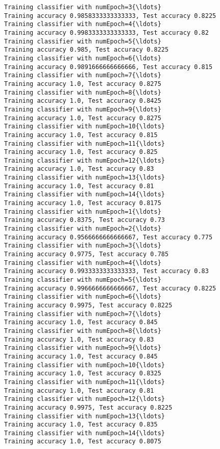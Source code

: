 \documentclass[11pt]{article}
\begin{document}
\begin{Verbatim}[commandchars=\\\{\}]
Training classifier with numEpoch=3{\ldots}
Training accuracy 0.9858333333333333, Test accuracy 0.8225
Training classifier with numEpoch=4{\ldots}
Training accuracy 0.9983333333333333, Test accuracy 0.82
Training classifier with numEpoch=5{\ldots}
Training accuracy 0.985, Test accuracy 0.8225
Training classifier with numEpoch=6{\ldots}
Training accuracy 0.9891666666666666, Test accuracy 0.815
Training classifier with numEpoch=7{\ldots}
Training accuracy 1.0, Test accuracy 0.8275
Training classifier with numEpoch=8{\ldots}
Training accuracy 1.0, Test accuracy 0.8425
Training classifier with numEpoch=9{\ldots}
Training accuracy 1.0, Test accuracy 0.8275
Training classifier with numEpoch=10{\ldots}
Training accuracy 1.0, Test accuracy 0.815
Training classifier with numEpoch=11{\ldots}
Training accuracy 1.0, Test accuracy 0.825
Training classifier with numEpoch=12{\ldots}
Training accuracy 1.0, Test accuracy 0.83
Training classifier with numEpoch=13{\ldots}
Training accuracy 1.0, Test accuracy 0.81
Training classifier with numEpoch=14{\ldots}
Training accuracy 1.0, Test accuracy 0.8175
Training classifier with numEpoch=1{\ldots}
Training accuracy 0.8375, Test accuracy 0.73
Training classifier with numEpoch=2{\ldots}
Training accuracy 0.9566666666666667, Test accuracy 0.775
Training classifier with numEpoch=3{\ldots}
Training accuracy 0.9775, Test accuracy 0.785
Training classifier with numEpoch=4{\ldots}
Training accuracy 0.9933333333333333, Test accuracy 0.83
Training classifier with numEpoch=5{\ldots}
Training accuracy 0.9966666666666667, Test accuracy 0.8225
Training classifier with numEpoch=6{\ldots}
Training accuracy 0.9975, Test accuracy 0.8225
Training classifier with numEpoch=7{\ldots}
Training accuracy 1.0, Test accuracy 0.845
Training classifier with numEpoch=8{\ldots}
Training accuracy 1.0, Test accuracy 0.83
Training classifier with numEpoch=9{\ldots}
Training accuracy 1.0, Test accuracy 0.845
Training classifier with numEpoch=10{\ldots}
Training accuracy 1.0, Test accuracy 0.8325
Training classifier with numEpoch=11{\ldots}
Training accuracy 1.0, Test accuracy 0.81
Training classifier with numEpoch=12{\ldots}
Training accuracy 0.9975, Test accuracy 0.8225
Training classifier with numEpoch=13{\ldots}
Training accuracy 1.0, Test accuracy 0.835
Training classifier with numEpoch=14{\ldots}
Training accuracy 1.0, Test accuracy 0.8075

    \end{Verbatim}
\end{document}

